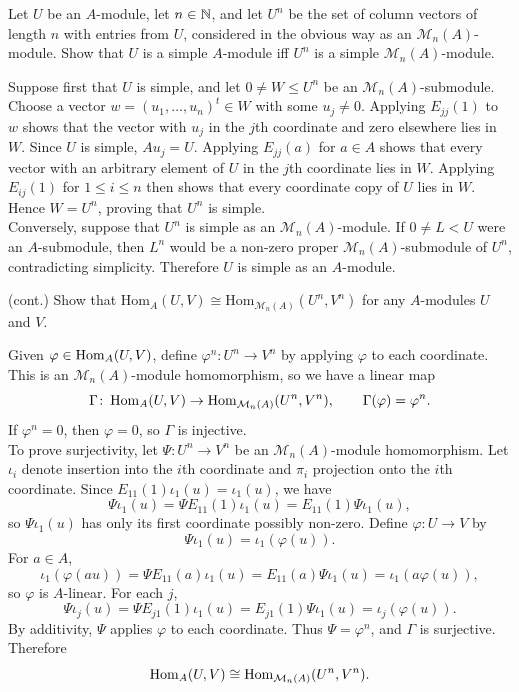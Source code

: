 \documentclass[../Odyssey_Project.tex]{subfiles}
\begin{document}
\begin{exercise}
\label{ex:13.6}
Let $U$ be an $A$-module, let $n \in \mathbb{N}$, and let $U^n$ be the set of column vectors of length $n$ with entries from $U$, considered in the obvious way as an $\mathcal{M}_n(A)$-module. Show that $U$ is a simple $A$-module iff $U^n$ is a simple $\mathcal{M}_n(A)$-module.
\end{exercise}
\begin{solution}
    Suppose first that $U$ is simple, and let $0\neq W\leq U^n$ be an $\mathcal{M}_n(A)$-submodule. Choose a vector $w=(u_1,\ldots,u_n)^t\in W$ with some $u_j\neq0$. Applying $E_{jj}(1)$ to $w$ shows that the vector with $u_j$ in the $j$th coordinate and zero elsewhere lies in $W$. Since $U$ is simple, $Au_j=U$. Applying $E_{jj}(a)$ for $a\in A$ shows that every vector with an arbitrary element of $U$ in the $j$th coordinate lies in $W$. Applying $E_{ij}(1)$ for $1\leq i\leq n$ then shows that every coordinate copy of $U$ lies in $W$. Hence $W=U^n$, proving that $U^n$ is simple.\\
    Conversely, suppose that $U^n$ is simple as an $\mathcal{M}_n(A)$-module. If $0\neq L<U$ were an $A$-submodule, then $L^n$ would be a non-zero proper $\mathcal{M}_n(A)$-submodule of $U^n$, contradicting simplicity. Therefore $U$ is simple as an $A$-module.
\end{solution}

\begin{exercise}
\label{ex:13.7}
(cont.) Show that $\mathrm{Hom}_A(U,V) \cong \mathrm{Hom}_{\mathcal{M}_n(A)}(U^n, V^n)$ for any $A$-modules $U$ and $V$.
\end{exercise}
\begin{solution}
    Given $\varphi\in\operatorname{Hom}_A(U,V)$, define $\varphi^n \colon U^n\to V^n$ by applying $\varphi$ to each coordinate. This is an $\mathcal{M}_n(A)$-module homomorphism, so we have a linear map
    \[
        \Gamma \colon \operatorname{Hom}_A(U,V)\to \operatorname{Hom}_{\mathcal{M}_n(A)}(U^n,V^n),
        \qquad \Gamma(\varphi)=\varphi^n.
    \]
    If $\varphi^n=0$, then $\varphi=0$, so $\Gamma$ is injective.\\
    To prove surjectivity, let $\Psi \colon U^n\to V^n$ be an $\mathcal{M}_n(A)$-module homomorphism. Let $\iota_i$ denote insertion into the $i$th coordinate and $\pi_i$ projection onto the $i$th coordinate. Since $E_{11}(1)\iota_1(u)=\iota_1(u)$, we have
    \[
        \Psi\iota_1(u)=\Psi E_{11}(1)\iota_1(u)=E_{11}(1)\Psi\iota_1(u),
    \]
    so $\Psi\iota_1(u)$ has only its first coordinate possibly non-zero. Define $\varphi \colon U\to V$ by
    \[
        \Psi\iota_1(u)=\iota_1(\varphi(u)).
    \]
    For $a\in A$,
    \[
        \iota_1(\varphi(au))
        =\Psi E_{11}(a)\iota_1(u)
        =E_{11}(a)\Psi\iota_1(u)
        =\iota_1(a\varphi(u)),
    \]
    so $\varphi$ is $A$-linear. For each $j$,
    \[
        \Psi\iota_j(u)=\Psi E_{j1}(1)\iota_1(u)=E_{j1}(1)\Psi\iota_1(u)=\iota_j(\varphi(u)).
    \]
    By additivity, $\Psi$ applies $\varphi$ to each coordinate. Thus $\Psi=\varphi^n$, and $\Gamma$ is surjective. Therefore
    \[
        \operatorname{Hom}_A(U,V)\cong \operatorname{Hom}_{\mathcal{M}_n(A)}(U^n,V^n).
    \]
\end{solution}
\end{document}
